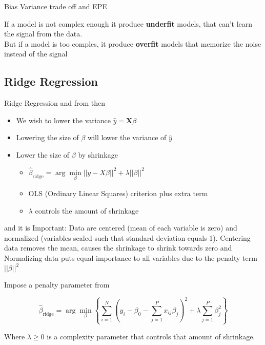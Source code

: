 Bias Variance trade off and EPE

If a model is not complex enough it produce \textbf{underfit} models, that can't learn the signal from the data.\\

But if a model is too comples, it produce \textbf{overfit} models that memorize the noise instead of the signal


\subsection{Ridge Regression}

Ridge Regression \cite[p.~61]{friedman2016elements} and from \cite[p.~53]{lecture1} then

\begin{itemize}
  \item We wish to lower the variance $\hat{y} = \bm{X} \beta$
  \item Lowering the size of $\beta$ will lower the variance of $\hat{y}$
  \item Lower the size of $\beta$ by shrinkage
  \begin{itemize}
    \item $\hat{\beta}_\text{ridge} = \arg \min\limits_\beta ||y - X \beta ||^2 + \lambda ||\beta||^2$
    \item OLS (Ordinary Linear Squares) criterion plus extra term
    \item $\lambda$ controls the amount of shrinkage
  \end{itemize}
\end{itemize}

and it is Important: Data are centered (mean of each variable is zero) and normalized (variables scaled such that standard deviation equals 1). Centering data removes the mean, causes the shrinkage to shrink
towards zero and Normalizing data puts equal importance to all variables due to the
penalty term $||\beta||^2$

Impose a penalty parameter from \cite[p.~63]{friedman2016elements}

\[
    \hat{\beta}_{\text{ridge}} = \arg \min\limits_{\beta} \left\{\sum_{i=1}^{N} (y_i - \beta_0 - \sum_{j=1}^{P} x_{ij} \beta_j)^2 + \lambda \sum_{j=1}^{P} \beta_j^2\right\}
\]

Where $\lambda \geq 0$ is a complexity parameter that controls that amount of shrinkage.

